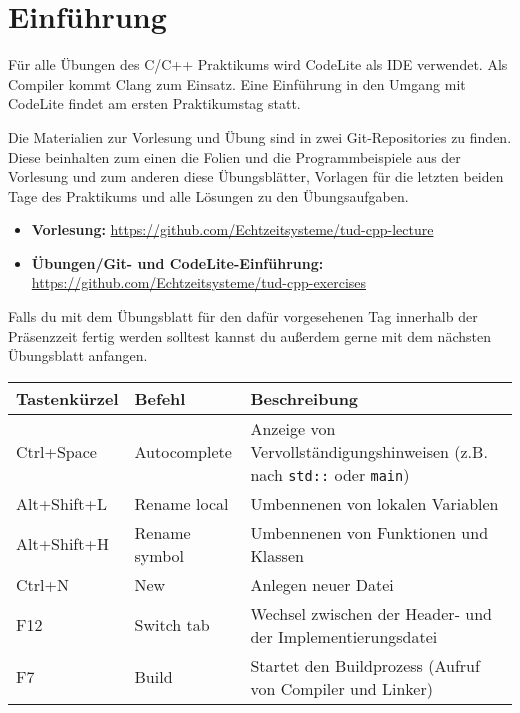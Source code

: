 
\section*{Einführung}
Für alle Übungen des C/C++ Praktikums wird CodeLite als IDE verwendet. Als Compiler kommt Clang zum Einsatz.
Eine Einführung in den Umgang mit CodeLite findet am ersten Praktikumstag statt.

Die Materialien zur Vorlesung und Übung sind in zwei Git-Repositories zu finden.
Diese beinhalten zum einen die Folien und die Programmbeispiele aus der Vorlesung und zum anderen diese Übungsblätter, Vorlagen für die letzten beiden Tage des Praktikums und alle Lösungen zu den Übungsaufgaben.

\begin{itemize}
	\item \textbf{Vorlesung:} \url{https://github.com/Echtzeitsysteme/tud-cpp-lecture}
	\item \textbf{Übungen/Git- und CodeLite-Einführung:} \url{https://github.com/Echtzeitsysteme/tud-cpp-exercises}
\end{itemize}

Falls du mit dem Übungsblatt für den dafür vorgesehenen Tag innerhalb der Präsenzzeit fertig werden solltest kannst du außerdem gerne mit dem nächsten Übungsblatt anfangen.



\begin{tabular}{l|l|p{11.5cm}}
    \toprule
    \textbf{Tastenkürzel} & \textbf{Befehl} & \textbf{Beschreibung}\\
    \midrule
	Ctrl+Space & Autocomplete &
	Anzeige von Vervollständigungshinweisen (z.B. nach \texttt{std::} oder \texttt{main})
	\\
	Alt+Shift+L & Rename local &
	Umbennenen von lokalen Variablen
	\\
	Alt+Shift+H & Rename symbol &
	Umbennenen von Funktionen und Klassen
	\\
	Ctrl+N & New &
	Anlegen neuer Datei
	\\
	F12 & Switch tab &
	Wechsel zwischen der Header- und der Implementierungsdatei
	\\
	F7 & Build &
	Startet den Buildprozess (Aufruf von Compiler und Linker)
    \\\bottomrule
\end{tabular}
